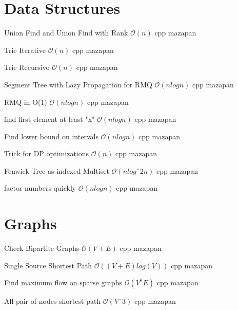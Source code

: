 \section{Data Structures}

{Union Find and Union Find with Rank}
{$\mathcal{O}(n)$}
{cpp}{}
{mazapan}

{Trie Iterative}
{$\mathcal{O}(n)$}
{cpp}{}
{mazapan}

{Trie Recursivo}
{$\mathcal{O}(n)$}
{cpp}{}
{mazapan}

{Segment Tree with Lazy Propagation for RMQ}
{$\mathcal{O}(nlogn)$}
{cpp}{}
{mazapan}

{RMQ in O(1)}
{$\mathcal{O}(nlogn)$}
{cpp}{}
{mazapan}

{find first element at least "x"}
{$\mathcal{O}(nlogn)$}
{cpp}{}
{mazapan}

{Find lower bound on intervals}
{$\mathcal{O}(nlogn)$}
{cpp}{}
{mazapan}

{Trick for DP optimizations}
{$\mathcal{O}(n)$}
{cpp}{}
{mazapan}

{Fenwick Tree as indexed Multiset}
{$\mathcal{O}(nlogˆ2n)$}
{cpp}{}
{mazapan}

{factor numbers quickly}
{$\mathcal{O}(nlogn)$}
{cpp}{}
{mazapan}

\section{Graphs}

{Check Bipartite Graphs}
{$\mathcal{O}(V + E)$}
{cpp}{}
{mazapan}

{Single Source Shortest Path}
{$\mathcal{O}((V + E)log(V))$}
{cpp}{}
{mazapan}

{Find maximum flow on sparse graphs}
{$\mathcal{O}(V^2E)$}
{cpp}{}
{mazapan}

{All pair of nodes shortest path}
{$\mathcal{O}(Vˆ3)$}
{cpp}{}
{mazapan}

